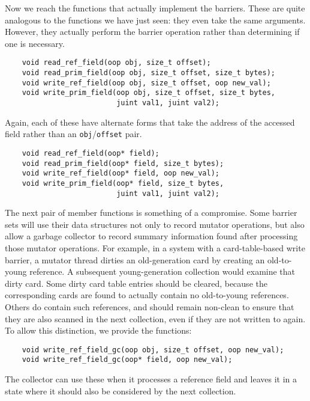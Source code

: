 \documentclass{article}
\begin{document}
Now we reach the functions that actually implement the barriers.
These are quite analogous to the functions we have just seen: they
even take the same arguments.  However, they actually perform the
barrier operation rather than determining if one is necessary.
\begin{verbatim}
    void read_ref_field(oop obj, size_t offset);
    void read_prim_field(oop obj, size_t offset, size_t bytes);
    void write_ref_field(oop obj, size_t offset, oop new_val);
    void write_prim_field(oop obj, size_t offset, size_t bytes,
                          juint val1, juint val2);
\end{verbatim}
Again, each of these have alternate forms that take the address of the
accessed field rather than an {\tt obj}/{\tt offset} pair.
\begin{verbatim}
    void read_ref_field(oop* field);
    void read_prim_field(oop* field, size_t bytes);
    void write_ref_field(oop* field, oop new_val);
    void write_prim_field(oop* field, size_t bytes,
                          juint val1, juint val2);
\end{verbatim}

The next pair of member functions is something of a compromise.  Some
barrier sets will use their data structures not only to record mutator
operations, but also allow a garbage collector to record summary
information found after processing those mutator operations.  For
example, in a system with a card-table-based write barrier, a mutator
thread dirties an old-generation card by creating an old-to-young
reference.  A subsequent young-generation collection would examine that
dirty card.  Some dirty card table entries should be cleared, because
the corresponding cards are found to actually contain no old-to-young
references.  Others do contain such references, and should remain
non-clean to ensure that they are also scanned in the next collection,
even if they are not written to again.  To allow this distinction, we
provide the functions:
\begin{verbatim}
    void write_ref_field_gc(oop obj, size_t offset, oop new_val);
    void write_ref_field_gc(oop* field, oop new_val);
\end{verbatim}
The collector can use these when it processes a reference field and
leaves it in a state where it should also be considered by the next
collection.

\end{document}
